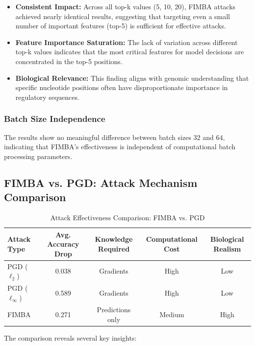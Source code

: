 \documentclass{article} %
\begin{document}
\begin{itemize}
    \item \textbf{Consistent Impact:} Across all top-k values (5, 10, 20), FIMBA attacks achieved nearly identical results, suggesting that targeting even a small number of important features (top-5) is sufficient for effective attacks.
    
    \item \textbf{Feature Importance Saturation:} The lack of variation across different top-k values indicates that the most critical features for model decisions are concentrated in the top-5 positions.
    
    \item \textbf{Biological Relevance:} This finding aligns with genomic understanding that specific nucleotide positions often have disproportionate importance in regulatory sequences.
\end{itemize}

\subsubsection{Batch Size Independence}

The results show no meaningful difference between batch sizes 32 and 64, indicating that FIMBA's effectiveness is independent of computational batch processing parameters.

\subsection{FIMBA vs. PGD: Attack Mechanism Comparison}

\begin{table}[h]
\centering
\caption{Attack Effectiveness Comparison: FIMBA vs. PGD}
\label{tab:attack_comparison}
\begin{tabular}{lcccc}
\toprule
\textbf{Attack Type} & \textbf{Avg. Accuracy Drop} & \textbf{Knowledge Required} & \textbf{Computational Cost} & \textbf{Biological Realism} \\
\midrule
PGD ($\ell_2$) & 0.038 & Gradients & High & Low \\
PGD ($\ell_\infty$) & 0.589 & Gradients & High & Low \\
FIMBA & 0.271 & Predictions only & Medium & High \\
\bottomrule
\end{tabular}
\end{table}

The comparison reveals several key insights:
\end{document}
